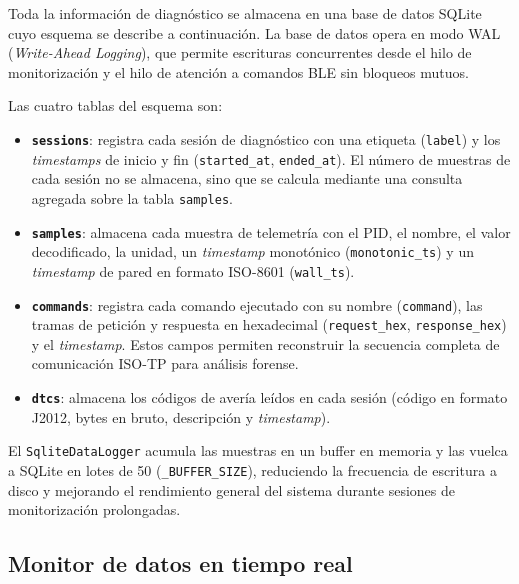 Toda la información de diagnóstico se almacena en una base de datos SQLite cuyo esquema se describe a continuación. La base de datos opera en modo WAL (\textit{Write-Ahead Logging}), que permite escrituras concurrentes desde el hilo de monitorización y el hilo de atención a comandos BLE sin bloqueos mutuos.

Las cuatro tablas del esquema son:

\begin{itemize}
    \item \textbf{\texttt{sessions}}: registra cada sesión de diagnóstico con una etiqueta (\texttt{label}) y los \textit{timestamps} de inicio y fin (\texttt{started\_at}, \texttt{ended\_at}). El número de muestras de cada sesión no se almacena, sino que se calcula mediante una consulta agregada sobre la tabla \texttt{samples}.

    \item \textbf{\texttt{samples}}: almacena cada muestra de telemetría con el PID, el nombre, el valor decodificado, la unidad, un \textit{timestamp} monotónico (\texttt{monotonic\_ts}) y un \textit{timestamp} de pared en formato ISO-8601 (\texttt{wall\_ts}).

    \item \textbf{\texttt{commands}}: registra cada comando ejecutado con su nombre (\texttt{command}), las tramas de petición y respuesta en hexadecimal (\texttt{request\_hex}, \texttt{response\_hex}) y el \textit{timestamp}. Estos campos permiten reconstruir la secuencia completa de comunicación ISO-TP para análisis forense.

    \item \textbf{\texttt{dtcs}}: almacena los códigos de avería leídos en cada sesión (código en formato J2012, bytes en bruto, descripción y \textit{timestamp}).
\end{itemize}

El \texttt{SqliteDataLogger} acumula las muestras en un buffer en memoria y las vuelca a SQLite en lotes de 50 (\texttt{\_BUFFER\_SIZE}), reduciendo la frecuencia de escritura a disco y mejorando el rendimiento general del sistema durante sesiones de monitorización prolongadas.

\subsection{Monitor de datos en tiempo real}

